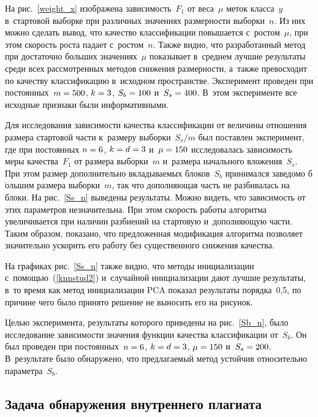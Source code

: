 \begin{multicols}{2}
На рис.~\ref{weight_x} изображена зависимость~$F_1$ от веса~$\mu$ меток класса~$y$ 
в~стартовой выборке при различных значениях размерности выборки~$n$. 
Из них можно сделать вывод, что качество классификации повышается с~ростом~$\mu$, 
при этом скорость роста падает с~ростом~$n$. Также видно, что разработанный метод 
при достаточно больших значениях~$\mu$ показывает в~среднем лучшие результаты 
среди всех рас\-смот\-рен\-ных методов снижения размерности, а~также превосходит 
по качеству классификацию в~исходном пространстве. Эксперимент проведен 
при постоянных~$m \hm= 500$,
$k \hm= 3$, $S_b \hm= 100$ и~$S_s \hm= 400$. 
В~этом эксперименте все исходные признаки были информативными.


Для исследования зависимости качества классификации от величины 
отношения размера стартовой части к~размеру выборки~$S_s/m$ был поставлен 
эксперимент, где при постоянных $n \hm= 6$, $k \hm= d \hm= 3$ 
и~$\mu \hm= 150$ исследовалась зависимость меры качест\-ва~$F_1$ от размера выборки~$m$ 
и~размера начального вложения~$S_s$. При этом размер дополнительно вкладываемых 
блоков~$S_b$ принимался заведомо б$\acute{\mbox{о}}$льшим размера выборки~$m$, 
так что дополняющая часть не разбивалась на блоки. На рис.~\ref{Ss_n} выведены 
результаты. Можно видеть, что зависимость от этих параметров незначительна. 
При этом скорость работы алгоритма увеличивается при наличии разбиений на 
стартовую и~дополняющую части. Таким образом, показано, что предложенная 
модификация алгоритма позволяет значительно ускорить его работу без 
существенного снижения качества.



На графиках рис.~\ref{Ss_n} также видно, что методы инициализации 
с~по\-мощью~(\ref{knnstud2}) и~случайной инициализации дают лучшие результаты, 
в~то время как метод инициализации PCA показал результаты порядка~0,5, 
по причине чего было принято решение не выносить его на рисунок.



Целью эксперимента, результаты которого приведены на рис.~\ref{Sb_n}, было 
исследование зависимости значения функции качества классификации от~$S_b$. 
Он был проведен при постоянных~$n \hm= 6$, $k \hm= d \hm= 3$, $\mu\hm = 150$
и~$S_s \hm= 200$. 
В~результате было обнаружено, что предлагаемый метод устойчив относительно 
параметра~$S_b$.

\subsection{Задача обнаружения внутреннего плагиата}


\end{multicols}
